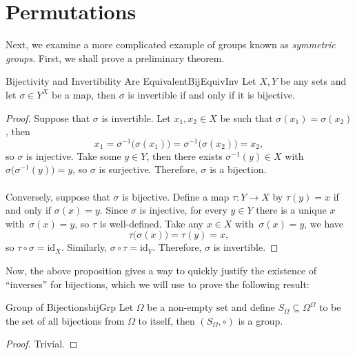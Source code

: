 \documentclass[math]{amznotes}
\theoremstyle{remark}
\newcommand{\0}{\mathbf{0}}
\newcommand{\1}{\mathbf{1}}
\begin{document}
\section{Permutations}
Next, we examine a more complicated example of groups known as \textit{symmetric groups}. First, we shall prove a preliminary theorem.
\begin{probox}{Bijectivity and Invertibility Are Equivalent}{BijEquivInv}
    Let $X, Y$ be any sets and let $\sigma \in Y^X$ be a map, then $\sigma$ is invertible if and only if it is bijective.
    \tcblower
    \begin{proof}
        Suppose that $\sigma$ is invertible. Let $x_1, x_2 \in X$ be such that $\sigma(x_1) = \sigma(x_2)$, then 
        \begin{equation*}
            x_1 = \sigma^{-1}\bigl(\sigma(x_1)\bigr) = \sigma^{-1}\bigl(\sigma(x_2)\bigr) = x_2,
        \end{equation*}
        so $\sigma$ is injective. Take some $y \in Y$, then there exists $\sigma^{-1}(y) \in X$ with $\sigma\bigl(\sigma^{-1}(y)\bigr) = y$, so $\sigma$ is surjective. Therefore, $\sigma$ is a bijection.
        \\\\
        Conversely, suppose that $\sigma$ is bijective. Define a map $\tau \colon Y \to X$ by $\tau(y) = x$ if and only if $\sigma(x) = y$. Since $\sigma$ is injective, for every $y \in Y$ there is a unique $x$ with~$\sigma(x) = y$, so $\tau$ is well-defined. Take any $x \in X$ with~$\sigma(x) = y$, we have
        \begin{equation*}
            \tau\bigl(\sigma(x)\bigr) = \tau(y) = x,
        \end{equation*}
        so $\tau \circ \sigma = \mathrm{id}_X$. Similarly, $\sigma \circ \tau = \mathrm{id}_Y$. Therefore, $\sigma$ is invertible.
    \end{proof}
\end{probox}
Now, the above proposition gives a way to quickly justify the existence of ``inverses'' for bijections, which we will use to prove the following result:
\begin{probox}{Group of Bijections}{bijGrp}
    Let $\Omega$ be a non-empty set and define $S_{\Omega} \subseteq \Omega^{\Omega}$ to be the set of all bijections from $\Omega$ to itself, then $\left(S_{\Omega}, \circ\right)$ is a group.
    \tcblower
    \begin{proof}
        Trivial.
    \end{proof}
\end{probox}
\end{document}

